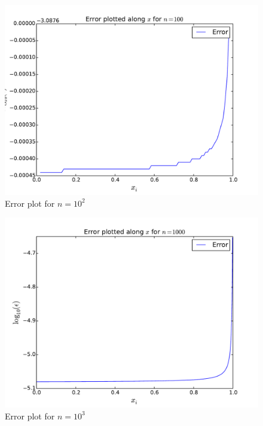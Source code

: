 \documentclass[english, 11pt]{article}
\begin{document}
\begin{figure}[H]
    \centering
    \includegraphics[width = \textwidth]{error_n_100.pdf}
    \caption{Error plot for $n=10^2$}
    \label{fig:en102}
\end{figure}

\begin{figure}[H]
    \centering
    \includegraphics[width = .9\textwidth]{error_n_1000.pdf}
    \caption{Error plot for $n=10^3$}
    \label{fig:en103}
\end{figure}
\end{document}
